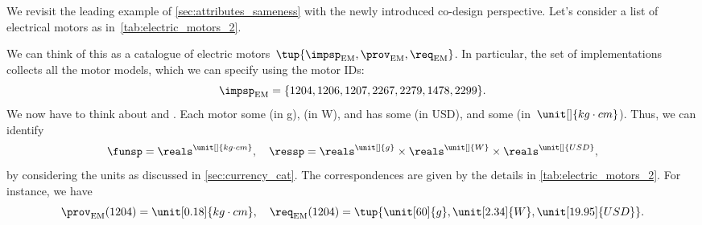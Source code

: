 \begin{example}
    \label{exa:dpi_elmotor}
    We revisit the leading example of \cref{sec:attributes_sameness} with the newly introduced co-design perspective. Let's consider a list of electrical motors as in~\cref{tab:electric_motors_2}.
    \begin{table*}[h]
        \centering
        \caption{A simplified catalogue of motors.}
        \label{tab:electric_motors_2}
    \end{table*}

    We can think of this as a catalogue of electric motors~$\tup{\impsp_\mathrm{EM},\prov_\mathrm{EM},\req_\mathrm{EM}}$.
    In particular, the set of implementations collects all the motor models, which we can specify using the motor IDs:
    \begin{equation}
        \impsp_\mathrm{EM}=\{1204,1206,1207,2267,2279,1478,2299 \}.
    \end{equation}
    We now have to think about  and .
    Each motor  some  (in \unit[]{g}),  (in \unit[]{W}), and has some  (in USD), and  some  (in~$\unit[]{kg\cdot cm}$).
    Thus, we can identify
    \begin{equation*}
        \funsp =\reals^{\unit[]{kg\cdot cm}},\quad \ressp=\reals^{\unit[]{g}}\times \reals^{\unit[]{W}}\times \reals^{\unit[]{USD}},
    \end{equation*}
    by considering the units as discussed in \cref{sec:currency_cat}.
    The correspondences are given by the details in \cref{tab:electric_motors_2}.
    For instance, we have
    \begin{equation}
        \prov_\mathrm{EM}(1204)=\unit[0.18]{kg\cdot cm}, \quad \req_\mathrm{EM}(1204)=\tup{\unit[60]{g},\unit[2.34]{W},\unit[19.95]{USD}}.
    \end{equation}


\end{example}
